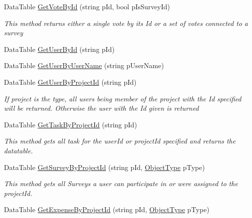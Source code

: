 \begin{DoxyCompactItemize}
Data\+Table \hyperlink{class_plex_byte_1_1_mo_cap_1_1_backend_1_1_backend_service_ae70783055b16533fcfee00f2ba93469d}{Get\+Vote\+By\+Id} (string p\+Id, bool p\+Is\+Survey\+Id)
\begin{DoxyCompactList}\small\item\em This method returns either a single vote by its Id or a set of votes connected to a survey \end{DoxyCompactList}\item 
Data\+Table \hyperlink{class_plex_byte_1_1_mo_cap_1_1_backend_1_1_backend_service_a6d666dd173330adbf0b356f0144d398c}{Get\+User\+By\+Id} (string p\+Id)
\item 
Data\+Table \hyperlink{class_plex_byte_1_1_mo_cap_1_1_backend_1_1_backend_service_ad65376b62e58ba7139cfdb50f05ed929}{Get\+User\+By\+User\+Name} (string p\+User\+Name)
\item 
Data\+Table \hyperlink{class_plex_byte_1_1_mo_cap_1_1_backend_1_1_backend_service_a5e1cf727726998caf3fc700dc363b3bb}{Get\+User\+By\+Project\+Id} (string p\+Id)
\begin{DoxyCompactList}\small\item\em If project is the type, all users being member of the project with the Id specified will be returned. Otherwise the user with the Id given is returned \end{DoxyCompactList}\item 
Data\+Table \hyperlink{class_plex_byte_1_1_mo_cap_1_1_backend_1_1_backend_service_a30889d7e1506e065e2f88854fae1b120}{Get\+Task\+By\+Project\+Id} (string p\+Id)
\begin{DoxyCompactList}\small\item\em This method gets all task for the user\+Id or project\+Id specified and returns the datatable. \end{DoxyCompactList}\item 
Data\+Table \hyperlink{class_plex_byte_1_1_mo_cap_1_1_backend_1_1_backend_service_a21b1069392da4037e583f9d9fcad9d81}{Get\+Survey\+By\+Project\+Id} (string p\+Id, \hyperlink{namespace_plex_byte_1_1_mo_cap_1_1_backend_acbe18958b9ae9c08f5c2d2c580fbbf2a}{Object\+Type} p\+Type)
\begin{DoxyCompactList}\small\item\em This method gets all Surveys a user can participate in or were assigned to the project\+Id. \end{DoxyCompactList}\item 
Data\+Table \hyperlink{class_plex_byte_1_1_mo_cap_1_1_backend_1_1_backend_service_a0d49092e2ea8d8d1a6cad6fb0155906f}{Get\+Expense\+By\+Project\+Id} (string p\+Id, \hyperlink{namespace_plex_byte_1_1_mo_cap_1_1_backend_acbe18958b9ae9c08f5c2d2c580fbbf2a}{Object\+Type} p\+Type)

\end{DoxyCompactItemize}
